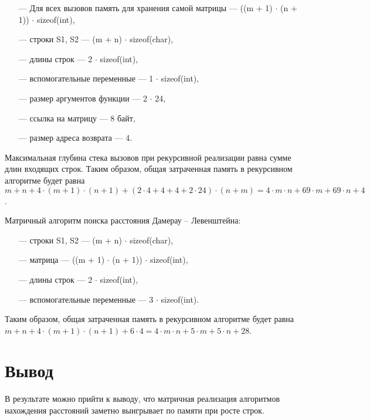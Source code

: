 \begin{itemize}
    \item[---] Для всех вызовов память для хранения самой матрицы ---  ((m + 1) $\cdot$ (n + 1)) $\cdot$ sizeof(int),
    \item[---] строки S1, S2 --- (m + n) $\cdot$ sizeof(char),
    \item[---] длины строк --- 2 $\cdot$ sizeof(int),
    \item[---] вспомогательные переменные ---  1 $\cdot$ sizeof(int),
    \item[---] размер аргументов функции --- 2 $\cdot$ 24,
    \item[---] ссылка на матрицу --- 8 байт,
    \item[---] размер адреса возврата --- 4.
\end{itemize}
	
Максимальная глубина стека вызовов при рекурсивной реализации равна сумме длин входящих строк. Таким образом, общая затраченная память в рекурсивном алгоритме будет равна $m + n + 4 \cdot (m + 1) \cdot (n + 1) + (2 \cdot 4 + 4 + 4 + 2 \cdot 24) \cdot (n + m) = 4\cdot m\cdot n + 69\cdot m + 69\cdot n + 4$.

Матричный алгоритм поиска расстояния Дамерау -- Левенштейна: 
\begin{itemize}
    \item[---] строки S1, S2 --- (m + n) $\cdot$ sizeof(char),
    \item[---] матрица --- ((m + 1) $\cdot$ (n + 1)) $\cdot$ sizeof(int),
    \item[---] длины строк --- 2 $\cdot$ sizeof(int),
    \item[---] вспомогательные переменные --- 3 $\cdot$ sizeof(int).
\end{itemize}

Таким образом, общая затраченная память в рекурсивном алгоритме будет равна $m + n + 4 \cdot (m + 1) \cdot (n + 1) + 6 \cdot 4 = 4\cdot m\cdot n + 5\cdot m + 5\cdot n + 28$.


\section{Вывод}

В результате можно прийти к выводу, что матричная реализация алгоритмов нахождения расстояний заметно выигрывает по памяти при росте строк.